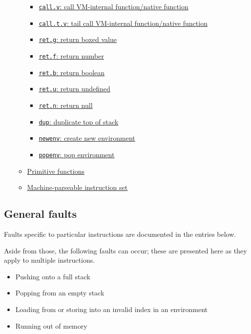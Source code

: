 \documentclass[11pt]{article}
\begin{document}
\begin{itemize}
\begin{itemize}
\begin{itemize}
\item \hyperref[sec:org008ae6e]{\texttt{call.v}:
call VM-internal function/native function}
\item \hyperref[sec:org22cfce9]{\texttt{call.t.v}:
tail call VM-internal function/native function}
\item \hyperref[sec:org5c86ae1]{\texttt{ret.g}: return boxed value}
\item \hyperref[sec:org24d7891]{\texttt{ret.f}: return number}
\item \hyperref[sec:org489d37c]{\texttt{ret.b}: return boolean}
\item \hyperref[sec:org4462eb4]{\texttt{ret.u}: return undefined}
\item \hyperref[sec:org02d0940]{\texttt{ret.n}: return null}
\item \hyperref[sec:orgde7ff7a]{\texttt{dup}: duplicate top of stack}
\item \hyperref[sec:orgb7d0128]{\texttt{newenv}: create new
environment}
\item \hyperref[sec:org4cc850b]{\texttt{popenv}: pop environment}
\end{itemize}

\item \hyperref[sec:org22a9c67]{Primitive functions}
\item \hyperref[sec:org5fffbe9]{Machine-parseable instruction
set}
\end{itemize}
\end{itemize}

\subsection{General faults}
\label{sec:orgd013882}
Faults specific to particular instructions are documented in the entries
below.

Aside from those, the following faults can occur; these are presented
here as they apply to multiple instructions.

\begin{itemize}
\item Pushing onto a full stack

\item Popping from an empty stack

\item Loading from or storing into an invalid index in an environment

\item Running out of memory
\end{itemize}
\end{document}
